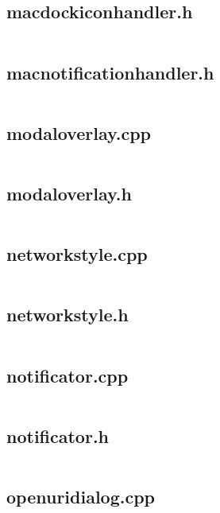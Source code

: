 \documentclass{article}
\begin{document}
\subsection{macdockiconhandler.h}
\inputminted{cpp}{/home/dufferzafar/dev/@clones/bitcoin/src/qt/macdockiconhandler.h}
\newpage

\subsection{macnotificationhandler.h}
\inputminted{cpp}{/home/dufferzafar/dev/@clones/bitcoin/src/qt/macnotificationhandler.h}
\newpage

\subsection{modaloverlay.cpp}
\inputminted{cpp}{/home/dufferzafar/dev/@clones/bitcoin/src/qt/modaloverlay.cpp}
\newpage

\subsection{modaloverlay.h}
\inputminted{cpp}{/home/dufferzafar/dev/@clones/bitcoin/src/qt/modaloverlay.h}
\newpage

\subsection{networkstyle.cpp}
\inputminted{cpp}{/home/dufferzafar/dev/@clones/bitcoin/src/qt/networkstyle.cpp}
\newpage

\subsection{networkstyle.h}
\inputminted{cpp}{/home/dufferzafar/dev/@clones/bitcoin/src/qt/networkstyle.h}
\newpage

\subsection{notificator.cpp}
\inputminted{cpp}{/home/dufferzafar/dev/@clones/bitcoin/src/qt/notificator.cpp}
\newpage

\subsection{notificator.h}
\inputminted{cpp}{/home/dufferzafar/dev/@clones/bitcoin/src/qt/notificator.h}
\newpage

\subsection{openuridialog.cpp}
\inputminted{cpp}{/home/dufferzafar/dev/@clones/bitcoin/src/qt/openuridialog.cpp}
\newpage
\end{document}
